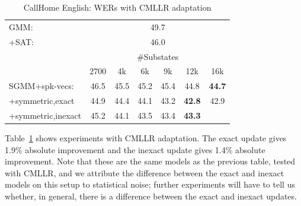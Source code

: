 \documentclass{article}
\begin{document}
\begin{table}[h]
 \renewcommand\arraycolsep{-0.1in}
  \begin{tabular}{|l|cccccc|}           \hline 
  GMM:            &  \multicolumn{6}{c|}{    49.7                             }   \\ 
  +SAT:           &  \multicolumn{6}{c|}{    46.0                             }   \\ \hline 
                  &   \multicolumn{6}{c|}{ \#Substates    }                \\
                  &  2700  &  4k    &  6k   & 9k     &  12k       &  16k    \\  \cline{2-7}
  SGMM+spk-vecs:  & 46.5    & 45.5  & 45.2   & 45.4  & 44.8        & {\bf 44.7} \\
 +symmetric,exact & 44.9    & 44.4  &  44.1  & 43.2  & {\bf 42.8}  & 42.9      \\ 
+symmetric,inexact& 45.2    & 44.1  &  43.5  &  43.4  & {\bf 43.3} &           \\ \hline
  \end{tabular}
   \caption{CallHome English: WERs with CMLLR adaptation}
 \label{tab:callhome:cmllr}
\end{table}


Table~\ref{tab:callhome:cmllr} shows experiments with CMLLR adaptation.  The exact
update gives 1.9\% absolute improvement and the inexact update gives 1.4\% absolute
improvement.  Note that these are the same models as the previous table, tested with
CMLLR, and we attribute the difference between the exact and inexact models on this 
setup to statistical noise; further experiments will have to tell us whether, in general,
there is a difference between the exact and inexact updates.  

\end{document}
